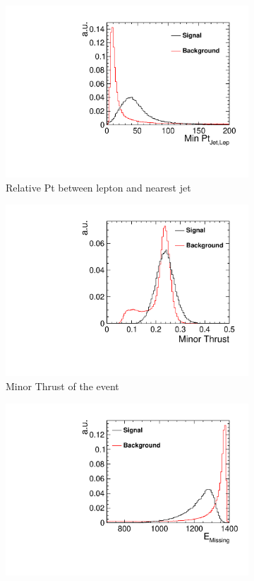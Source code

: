 \begin{figure}[ht]\ContinuedFloat 
  \begin{subfigure}[b]{0.5\linewidth}
    \centering
    \includegraphics[width=0.75\linewidth]{Appendix/figures/MinJetLepPt} 
    \caption{Relative Pt between lepton and nearest jet} 
    \vspace{4ex}
  \end{subfigure}%
  \begin{subfigure}[b]{0.5\linewidth}
    \centering
    \includegraphics[width=0.75\linewidth]{Appendix/figures/MinorThrust} 
    \caption{Minor Thrust of the event} 
    \vspace{4ex}
  \end{subfigure} 
  \begin{subfigure}[b]{0.5\linewidth}
    \centering
    \includegraphics[width=0.75\linewidth]{Appendix/figures/MissingE} 

\end{subfigure}
\end{figure}
